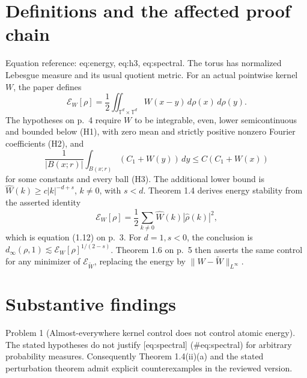 \documentclass[10pt]{article}
\begin{document}
\section*{Definitions and the affected proof chain}
Equation reference: eq:energy, eq:h3, eq:spectral. The torus has normalized Lebesgue measure and its usual quotient metric. For an actual pointwise kernel \(W\), the paper defines \[
 \mathcal E_W[\rho]=\frac12\iint_{\mathbb T^d\times\mathbb T^d}
 W(x-y)\,d\rho(x)\,d\rho(y).\] The hypotheses on p. 4 require \(W\) to be integrable, even, lower semicontinuous and bounded below (H1), with zero mean and strictly positive nonzero Fourier coefficients (H2), and \[
 \frac1{|B(x;r)|}\int_{B(x;r)}(C_1+W(y))\,dy
 \le C(C_1+W(x))\] for some constants and every ball (H3). The additional lower bound is \(\widehat W(k)\ge c|k|^{-d+s}\), \(k\ne0\), with \(s<d\). Theorem 1.4 derives energy stability from the asserted identity \[
 \mathcal E_W[\rho]=\frac12\sum_{k\ne0}\widehat W(k)|\widehat\rho(k)|^2,\] which is equation (1.12) on p. 3. For \(d=1,s<0\), the conclusion is \(d_\infty(\rho,1)\lesssim \mathcal E_W[\rho]^{1/(2-s)}\). Theorem 1.6 on p. 5 then asserts the same control for any minimizer of \(\mathcal E_{\widetilde W}\), replacing the energy by \(\|W-\widetilde W\|_{L^\infty}\).\par
\section*{Substantive findings}
Problem 1 (Almost-everywhere kernel control does not control atomic energy).  The stated hypotheses do not justify [eq:spectral] (\#eq:spectral) for arbitrary probability measures. Consequently Theorem 1.4(ii)(a) and the stated perturbation theorem admit explicit counterexamples in the reviewed version.\par
\end{document}

